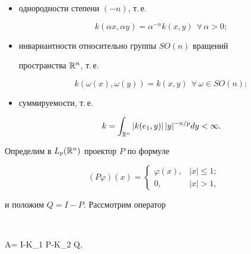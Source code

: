 \begin{itemize}


\item[$1^\circ$.] однородности степени $(-n)$, т.\,е.


$$


k(\alpha x,\alpha y)=\alpha^{-n}k(x,y) \ \


\forall\, \alpha>0;


$$


\item[$2^\circ$.] инвариантности относительно группы $SO(n)$ вращений


пространства $\Bbb R^n$, т.\,е.


$$


k(\omega(x),\omega(y))=k(x,y) \ \ 


\forall\, \omega\in SO(n);


$$


\item[$3^\circ$.] суммируемости, т.\,е.


$$


k=\int_{\Bbb R^n}|k(e_1,y)|\,|y|^{-n/p}dy<\infty.


$$


\end{itemize}





Определим в $L_p(\Bbb R^n)$ проектор $P$ по формуле


$$




(P\varphi)(x)=


\begin{cases}


\varphi(x), & |x|\leqslant 1;\\


0, & |x|>1,


\end{cases}




$$


и положим $Q=I-P$. Рассмотрим оператор


$$




A= \lambda I-K_1 P-K_2 Q,




